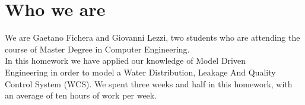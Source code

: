 \newpage \section{\textbf{Who we are}}
We are Gaetano Fichera and Giovanni Lezzi, two students who are attending the course of Master Degree in Computer Engineering.\\
In this homework we have applied our knowledge of Model Driven \\
Engineering in order to model a Water Distribution, Leakage And Quality Control System (WCS). We spent three weeks and half in this homework, with an average of ten hours of work per week.
